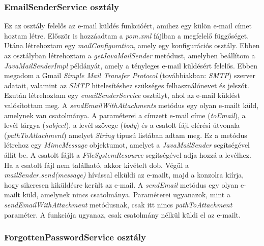 \subsubsection{EmailSenderService osztály}

Ez az osztály felelős az e-mail küldés funkcióért, amihez egy külön e-mail címet hoztam létre. Először is hozzáadtam a \textit{pom.xml} fájlban a megfelelő függőséget. Utána létrehoztam egy \textit{mailConfiguration}, amely egy konfigurációs osztály. Ebben az osztályban létrehoztam a \textit{getJavaMailSender} metódust, amelyben beállítom a \textit{JavaMailSenderImpl} példányát, amely a tényleges e-mail küldésért felelős. Ebben megadom a Gmail \textit{Simple Mail Transfer Protocol} (továbbiakban: \textit{SMTP}) \cite{SMTP} szerver adatait, valamint az \textit{SMTP} hitelesítéshez szükséges felhasználónevet és jelszót. Ezután létrehoztam egy \textit{emailSenderService} osztályt, ahol az e-mail küldést valósítottam meg. A \textit{sendEmailWithAttachments} metódus egy olyan e-mailt küld, amelynek van csatolmánya. A paraméterei a címzett e-mail címe (\textit{toEmail}), a levél tárgya (\textit{subject}), a levél szövege (\textit{body}) és a csatolt fájl elérési útvonala (\textit{pathToAttachment}) amelyet \textit{String} típusú listában adtam meg. Ez a metódus létrehoz egy \textit{MimeMessage} objektumot, amelyet a \textit{JavaMailSender} segítségével állít be. A csatolt fájlt a \textit{FileSystemResource} segítségével adja hozzá a levélhez. Ha a csatolt fájl nem található, akkor kivételt dob. Végül a \textit{mailSender.send(message)} hívással elküldi az e-mailt, majd a konzolra kiírja, hogy sikeresen kiküldésre került az e-mail. A \textit{sendEmail} metódus egy olyan e-mailt küld, amelynek nincs csatolmánya. Paraméterei ugyanazok, mint a \textit{sendEmailWithAttachment} metódusnak, csak itt nincs \textit{pathToAttachment} paraméter. A funkciója ugyanaz, csak csatolmány nélkül küldi el az e-mailt.

\subsubsection{ForgottenPasswordService osztály}


